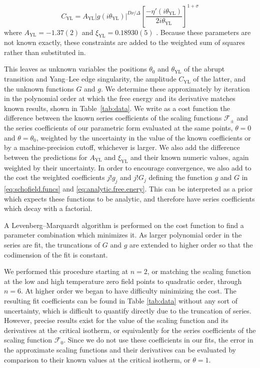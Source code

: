 \documentclass[
aps,
pre,
preprint,
longbibliography,
floatfix
]{revtex4-2}
\begin{document}
\begin{equation}
  C_\mathrm{YL}=A_\mathrm{YL}|g(i\theta_\mathrm{YL})|^{D\nu/\Delta}\left[\frac{-\eta'(i\theta_\mathrm{YL})}{2i\theta_\mathrm{YL}}\right]^{1+\sigma}
\end{equation}
where $A_\mathrm{YL}=-1.37(2)$ and $\xi_\mathrm{YL}=0.18930(5)$
\cite{Fonseca_2003_Ising}. Because these parameters are not known exactly,
these constraints are added to the weighted sum of squares rather than
substituted in.

This leaves as unknown variables the positions $\theta_0$ and
$\theta_{\mathrm{YL}}$ of the abrupt transition and Yang--Lee edge singularity,
the amplitude $C_\mathrm{YL}$ of the latter, and the unknown functions $G$ and
$g$. We determine these approximately by iteration in the polynomial order at
which the free energy and its derivative matches known results, shown in
Table~\ref{tab:data}. We write as a cost function the difference between the
known series coefficients of the scaling functions $\mathcal F_\pm$ and the
series coefficients of our parametric form evaluated at the same points,
$\theta=0$ and $\theta=\theta_0$, weighted by the uncertainty in the value of
the known coefficients or by a machine-precision cutoff, whichever is larger.
We also add the difference between the predictions for $A_\mathrm{YL}$ and
$\xi_\mathrm{YL}$ and their known numeric values, again weighted by their
uncertainty. In order to encourage convergence, we also add to the cost the
weighted coefficients $j!g_j$ and $j!G_j$ defining the function $g$ and $G$ in
\eqref{eq:schofield.funcs} and \eqref{eq:analytic.free.enery}. This can be
interpreted as a prior which expects these functions to be analytic, and
therefore have series coefficients which decay with a factorial.

A Levenberg--Marquardt algorithm is performed on the cost function to find a
parameter combination which minimizes it. As larger polynomial order in the
series are fit, the truncations of $G$ and $g$ are extended to higher order so
that the codimension of the fit is constant.

We performed this procedure starting at $n=2$, or matching the scaling
function at the low and high temperature zero field points to quadratic order,
through $n=6$. At higher order we began to have difficulty minimizing the cost.
The resulting fit coefficients can be found in Table \ref{tab:data} without any
sort of uncertainty, which is difficult to quantify directly due to the
truncation of series. However, precise results exist for the value of the
scaling function and its derivatives at the critical isotherm, or equivalently
for the series coefficients of the scaling function $\mathcal F_0$. Since we do
not use these coefficients in our fits, the error in the approximate scaling
functions and their derivatives can be evaluated by comparison to their known
values at the critical isotherm, or $\theta=1$.
\end{document}
